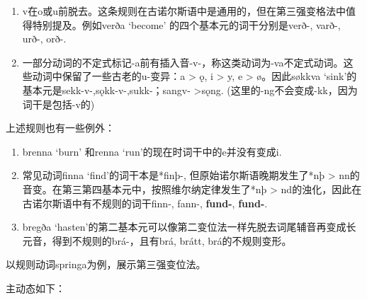 \begin{enumerate}
  \def\labelenumi{\arabic{enumi})}
  \setcounter{enumi}{3}
  \item
        v在o或u前脱去。这条规则在古诺尔斯语中是通用的，但在第三强变格法中值得特别提及。例如verða
        `become‌' 的四个基本元的词干分别是verð-, varð-, urð-, orð-.
  \item
        一部分动词的不定式标记-a前有插入音-v-，称这类动词为-va不定式动词。这些动词中保留了一些古老的u-变异：a
        \textgreater{} ǫ, i \textgreater{} y, e \textgreater{} ø。因此søkkva
        `sink‌'的基本元是sekk-v-,sǫkk-v-,sukk-；sangv- \textgreater sǫng.
        (这里的-ng不会变成-kk，因为词干是包括-v的)
\end{enumerate}

上述规则也有一些例外：

\begin{enumerate}
  \def\labelenumi{\arabic{enumi})}
  \item
        brenna `burn‌' 和renna `run‌'的现在时词干中的e并没有变成i.
  \item
        \label{_Ref116921872}{}常见动词finna
        `find‌'的词干本是*finþ-, 但原始诺尔斯语晚期发生了*nþ \textgreater{}
        nn的音变。在第三第四基本元中，按照维尔纳定律发生了*nþ \textgreater{}
        nd的浊化，因此在古诺尔斯语中有不规则的词干finn-, fann-,
        \textbf{fund-}, \textbf{fund-}.
  \item
        bregða
        `hasten‌'的第二基本元可以像第二变位法一样先脱去词尾辅音再变成长元音，得到不规则的brá-，且有brá,
        brátt, brá的不规则变形。
\end{enumerate}

以规则动词springa为例，展示第三强变位法。

主动态如下：

